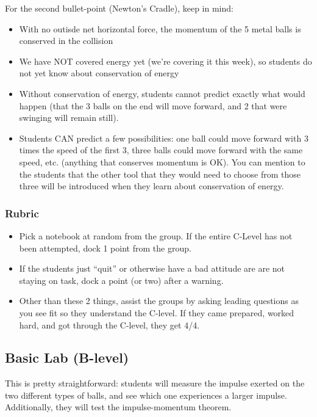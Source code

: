 \documentclass[fleqn,letterpaper]{article}
\begin{document}
For the second bullet-point (Newton's Cradle), keep in mind:

\begin{itemize}
 \item{With no outisde net horizontal force, the momentum of the 5 metal balls is conserved in the collision}
 \item{We have NOT covered energy yet (we're covering it this week), so students do not yet know about conservation of energy}
 \item{Without conservation of energy, students cannot predict exactly what would happen (that the 3 balls on the end will move forward, and 2 that were swinging will remain still).}
 \item{Students CAN predict a few possibilities: one ball could move forward with 3 times the speed of the first 3, three balls could move forward with the same speed, etc. (anything that conserves momentum is OK).  You can mention to the students that the other tool that they would need to choose from those three will be introduced when they learn about conservation of energy.}
\end{itemize}


\subsubsection*{Rubric}

\begin{itemize}
 \item{Pick a notebook at random from the group.  If the entire C-Level has not been attempted, dock 1 point from the group.}
 \item{If the students just ``quit'' or otherwise have a bad attitude are are not staying on task, dock a point (or two) after a warning.}
 \item{Other than these 2 things, assist the groups by asking leading questions as you see fit so they understand the C-level.  If they came prepared, worked hard, and got through the C-level, they get 4/4.}
\end{itemize}


\subsection*{Basic Lab (B-level)}

This is pretty straightforward: students will measure the impulse exerted on the two different types of balls, and see which one experiences a larger impulse.  Additionally, they will test the impulse-momentum theorem.
\end{document}
